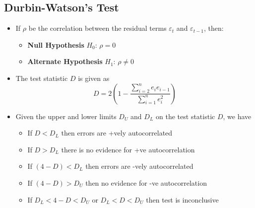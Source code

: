 \documentclass{article}
\theoremstyle{plain}
\theoremstyle{definition}
\begin{document}
\subsection{Durbin-Watson's Test}
\begin{itemize}
    \item If $\rho$ be the correlation between the residual terms $\varepsilon_t$ and $\varepsilon_{t-1}$, then:
    \begin{itemize}
        \item \textbf{Null Hypothesis} $H_0$: $\rho = 0$
        \item \textbf{Alternate Hypothesis} $H_1$: $\rho \ne 0$
    \end{itemize}
    
    \item The test statistic $D$ is given as
    \begin{equation*}
        D = 2 \left (1 - \frac{\sum\limits_{i=2}^{n} e_i e_{i-1}}{\sum\limits_{i=1}^{n} e_i^2} \right )
    \end{equation*}
    
    \item Given the upper and lower limits $D_U$ and $D_L$ on the test statistic $D$, we have
    \begin{itemize}
        \item If $D < D_L$ then errors are +vely autocorrelated
        
        \item If $D > D_L$ there is no evidence for +ve autocorrelation
        
        \item If $(4-D) < D_L$ then errors are -vely autocorrelated
        
        \item If $(4-D) > D_U$ then no evidence for -ve autocorrelation
        
        \item If $D_L < 4-D < D_U$ or $D_L < D < D_U$ then test is inconclusive
    \end{itemize}
\end{itemize}
\end{document}
